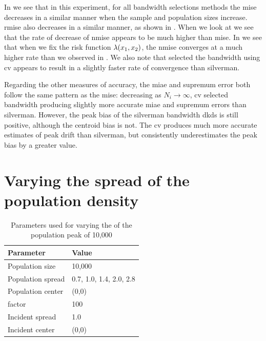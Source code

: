 In  we see that in this experiment,
for all bandwidth selections methods the \gls{mise} decreases in a similar manner when the sample and population sizes increase.
\Gls{rmise} also decreases in a similar manner, as shown in .
When we look at  we see that the rate of decrease of \gls{nmise} appears to be much higher than \gls{mise}.
In  we see that when we fix the risk function $\lambda (x_1, x_2)$,
the \gls{nmise} converges at a much higher rate than we observed in .
We also note that selected the bandwidth using \gls{cv} appears to result in a slightly faster rate of convergence than \gls{silverman}.



Regarding the other measures of accuracy, the \gls{miae} and \gls{supremum error} both follow the same pattern as the \gls{mise}:
decreasing as $N_i \to \infty$,
\gls{cv} selected bandwidth producing slightly more accurate \gls{miae} and \glspl{supremum error} than \gls{silverman}.
However, the \gls{peak bias} of the \gls{silverman} bandwidth \glspl{dkd} is still positive, although the \gls{centroid bias} is not.
The \gls{cv} produces much more accurate estimates of \gls{peak drift} than \gls{silverman}, but consistently underestimates the \gls{peak bias} by a greater value.

\section{Varying the spread of the population density}
\label{sec:results:pop_spread}

\begin{table}[htbp]
    \centering
    \begin{tabular}{ll}
        \toprule
        Parameter & Value \\
        \midrule
        Population size & 10,000 \\
        Population \gls{spread} & 0.7, 1.0, 1.4, 2.0, 2.8 \\
        Population center & (0,0) \\
        \Gls{factor} & 100 \\
        Incident \gls{spread} & 1.0 \\
        Incident center & (0,0) \\
        \bottomrule
    \end{tabular}
    \caption{Parameters used for varying the  of the population peak of 10,000}
    \label{tab:params:pop_spread}
\end{table}

